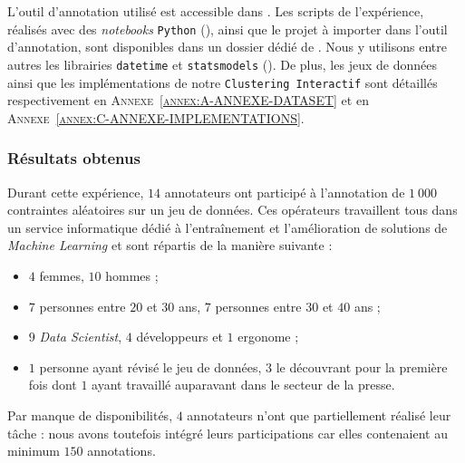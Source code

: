 			\setcounter{localCounterOfFootnoteValue}{\value{footnote}}
			\begin{leftBarInformation}
				L'outil d'annotation utilisé est accessible dans \cite{schild-etal:2022:cognitivefactory-interactiveclusteringgui}.
				Les scripts de l'expérience, réalisés avec des \textit{notebooks} \texttt{Python} (\cite{van-rossum-drake:2009:python-reference-manual}), ainsi que le projet à importer dans l'outil d'annotation, sont disponibles dans un dossier dédié de \cite{schild:2021:cognitivefactory-interactiveclusteringcomparativestudy}.
				Nous y utilisons entre autres les librairies \texttt{datetime} \footnotemark et \texttt{statsmodels} \footnotemark (\cite{seabold-perktold:2010:statsmodels-econometric-statistical}).
				De plus, les jeux de données ainsi que les implémentations de notre \texttt{Clustering Interactif} sont détaillés respectivement en \textsc{Annexe~\ref{annex:A-ANNEXE-DATASET}} et en \textsc{Annexe~\ref{annex:C-ANNEXE-IMPLEMENTATIONS}}.
			\end{leftBarInformation}
				

		\subsubsection{Résultats obtenus}
		
			Durant cette expérience, $14$ annotateurs ont participé à l'annotation de $1~000$ contraintes aléatoires sur un jeu de données.
			Ces opérateurs travaillent tous dans un service informatique dédié à l'entraînement et l'amélioration de solutions de \textit{Machine Learning} et sont répartis de la manière suivante :
			\begin{itemize}
				\item $4$ femmes, $10$ hommes ;
				\item $7$ personnes entre $20$ et $30$ ans, $7$ personnes entre $30$ et $40$ ans ;
				\item $9$ \textit{Data Scientist}, $4$ développeurs et $1$ ergonome ;
				\item $1$ personne ayant révisé le jeu de données, $3$ le découvrant pour la première fois dont $1$ ayant travaillé auparavant dans le secteur de la presse.
			\end{itemize}
			Par manque de disponibilités, $4$ annotateurs n'ont que partiellement réalisé leur tâche : nous avons toutefois intégré leurs participations car elles contenaient au minimum $150$ annotations.
			
